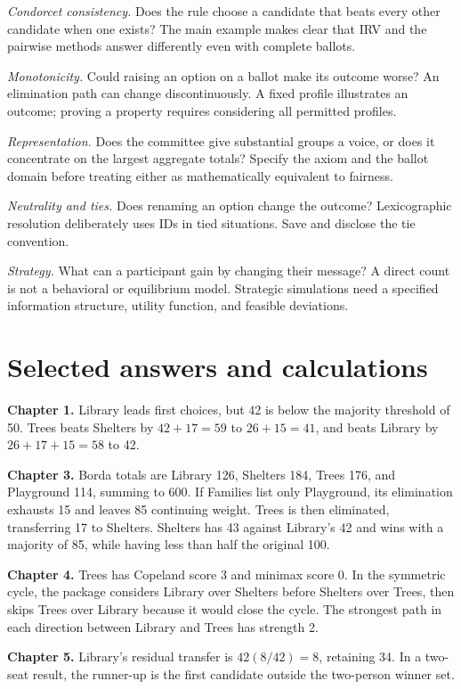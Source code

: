 \emph{Condorcet consistency.} Does the rule choose a candidate that beats every other candidate when one exists? The main example makes clear that IRV and the pairwise methods answer differently even with complete ballots.

\emph{Monotonicity.} Could raising an option on a ballot make its outcome worse? An elimination path can change discontinuously. A fixed profile illustrates an outcome; proving a property requires considering all permitted profiles.

\emph{Representation.} Does the committee give substantial groups a voice, or does it concentrate on the largest aggregate totals? Specify the axiom and the ballot domain before treating either as mathematically equivalent to fairness.

\emph{Neutrality and ties.} Does renaming an option change the outcome? Lexicographic resolution deliberately uses IDs in tied situations. Save and disclose the tie convention.

\emph{Strategy.} What can a participant gain by changing their message? A direct count is not a behavioral or equilibrium model. Strategic simulations need a specified information structure, utility function, and feasible deviations.

\section{Selected answers and calculations}
\textbf{Chapter 1.} Library leads first choices, but 42 is below the majority threshold of 50. Trees beats Shelters by $42+17=59$ to $26+15=41$, and beats Library by $26+17+15=58$ to 42.

\textbf{Chapter 3.} Borda totals are Library 126, Shelters 184, Trees 176, and Playground 114, summing to 600. If Families list only Playground, its elimination exhausts 15 and leaves 85 continuing weight. Trees is then eliminated, transferring 17 to Shelters. Shelters has 43 against Library's 42 and wins with a majority of 85, while having less than half the original 100.

\textbf{Chapter 4.} Trees has Copeland score 3 and minimax score 0. In the symmetric cycle, the package considers Library over Shelters before Shelters over Trees, then skips Trees over Library because it would close the cycle. The strongest path in each direction between Library and Trees has strength 2.

\textbf{Chapter 5.} Library's residual transfer is $42(8/42)=8$, retaining 34. In a two-seat result, the runner-up is the first candidate outside the two-person winner set.


